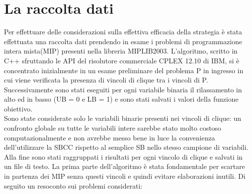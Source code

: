 \documentclass[12pt,a4paper,twoside,openright]{book}
\begin{document}
\section{La raccolta dati}
Per effettuare delle considerazioni sulla effettiva efficacia della strategia è stata effettuata 
una raccolta dati prendendo in esame i problemi di programmazione intera mista(MIP) presenti
nella libreria MIPLIB2003. L’algoritmo, scritto in C++ sfruttando le API del risolutore 
commerciale CPLEX 12.10 di IBM, si è concentrato inizialmente in un esame preliminare del 
problema P in ingresso in cui viene verificata la presenza di vincoli di clique tra i vincoli di P. 
Successivamente sono stati eseguiti per ogni variabile binaria il rilassamento in alto ed in basso 
(UB  = 0 e LB = 1) e sono stati salvati i valori della funzione obiettivo. \\
Sono state considerate solo le variabili binarie presenti nei vincoli di clique: un confronto globale
su tutte le variabili intere sarebbe stato molto costoso computazionalmente e non avrebbe messo bene 
in luce la convenienza dell'utilizzare la SBCC rispetto al semplice SB nello stesso campione di variabili.\\
Alla fine sono stati raggruppati i risultati per ogni vincolo di clique e salvati in un file di testo. 
La prima parte dell’algoritmo è stata fondamentale per scartare in partenza dei MIP senza 
questi vincoli e quindi evitare elaborazioni inutili.
\clearpage
\pagebreak 
Di seguito un resoconto sui problemi considerati:
\end{document}
